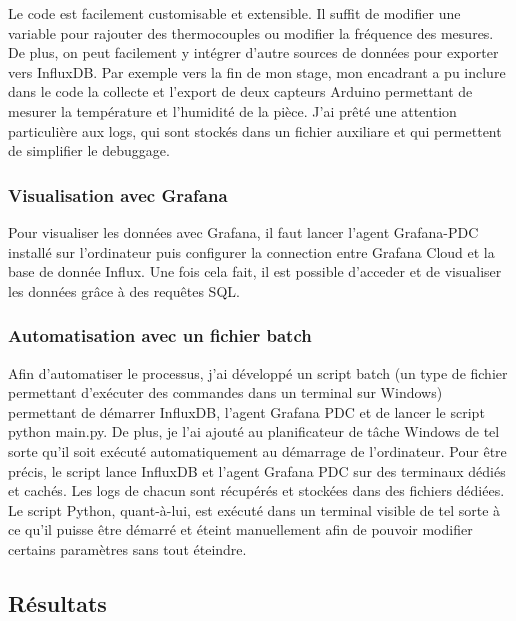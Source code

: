\documentclass[12pt, a4paper]{article}
\begin{document}
Le code est facilement customisable et extensible. Il suffit de modifier une variable pour rajouter des thermocouples ou modifier la fréquence des mesures. De plus, on peut facilement y intégrer d'autre sources de données pour exporter vers InfluxDB. Par exemple vers la fin de mon stage, mon encadrant a pu inclure dans le code la collecte et l'export de deux capteurs Arduino permettant de mesurer la température et l'humidité de la pièce. J'ai prêté une attention particulière aux logs, qui sont stockés dans un fichier auxiliare et qui permettent de simplifier le debuggage. 

\subsubsection{Visualisation avec Grafana}

Pour visualiser les données avec Grafana, il faut lancer l'agent Grafana-PDC installé sur l'ordinateur puis configurer la connection entre Grafana Cloud et la base de donnée Influx. Une fois cela fait, il est possible d'acceder et de visualiser les données grâce à des requêtes SQL\@. 

\subsubsection{Automatisation avec un fichier batch}

Afin d'automatiser le processus, j'ai développé un script batch (un type de fichier permettant d'exécuter des commandes dans un terminal sur Windows) permettant de démarrer InfluxDB, l'agent Grafana PDC et de lancer le script python main.py. De plus, je l'ai ajouté au planificateur de tâche Windows de tel sorte qu'il soit exécuté automatiquement au démarrage de l'ordinateur. Pour être précis, le script lance InfluxDB et l'agent Grafana PDC sur des terminaux dédiés et cachés. Les logs de chacun sont récupérés et stockées dans des fichiers dédiées. Le script Python, quant-à-lui, est exécuté dans un terminal visible de tel sorte à ce qu'il puisse être démarré et éteint manuellement afin de pouvoir modifier certains paramètres sans tout éteindre. 

\subsection{Résultats}
\end{document}

